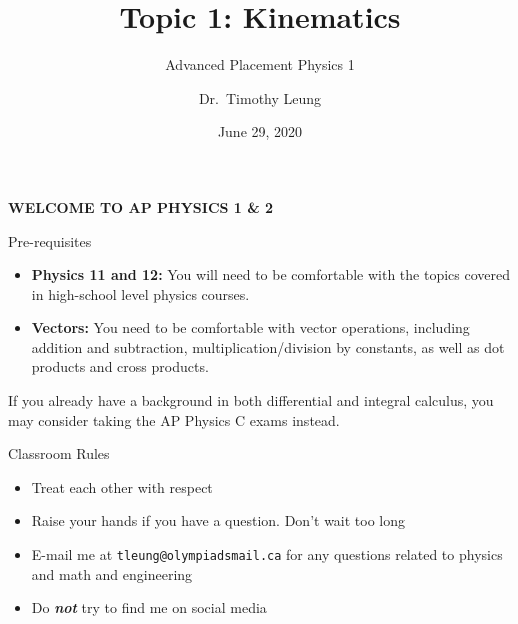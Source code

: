 \documentclass[12pt,compress,aspectratio=169]{beamer}
\title{Topic 1: Kinematics}
\subtitle{Advanced Placement Physics 1}
\author[TML]{Dr.\ Timothy Leung}
\institute{Olympiads School}
\date{June 29, 2020}
\begin{document}
\begin{frame}{}

  {\LARGE
    \begin{center}
      \textbf{WELCOME TO AP PHYSICS 1 \& 2}
    \end{center}
  }
\end{frame}



\begin{frame}{Pre-requisites}
  \begin{itemize}
  \item\textbf{Physics 11 and 12:} You will need to be comfortable with the
    topics covered in high-school level physics courses.
  \item\textbf{Vectors:} You need to be comfortable with vector operations,
    including addition and subtraction, multiplication/division by constants,
    as well as dot products and cross products.
  \end{itemize}
  If you already have a background in both differential and integral calculus,
  you may consider taking the AP Physics C exams instead.
\end{frame}






\begin{frame}{Classroom Rules}
  \begin{itemize}
  \item Treat each other with respect
  \item Raise your hands if you have a question. Don't wait too long
  \item E-mail me at \texttt{tleung@olympiadsmail.ca} for any questions related
    to physics and math and engineering
  \item Do \textbf{\emph{not}} try to find me on social media
  \end{itemize}
\end{frame}
\end{document}
